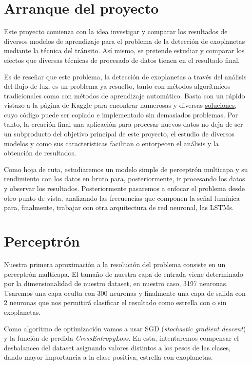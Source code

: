 
\section{Arranque del proyecto}

Este proyecto comienza con la idea investigar y comparar los resultados de diversos modelos de aprendizaje para el problema de la detección de exoplanetas mediante la técnica del tránsito. Así mismo, se pretende estudiar y comparar los efectos que diversas técnicas de procesado de datos tienen en el resultado final.

Es de reseñar que este problema, la detección de exoplanetas a través del análisis del flujo de luz, es un problema ya resuelto, tanto con métodos algorítmicos tradicionales como con métodos de aprendizaje automático. Basta con un rápido vistazo a la página de Kaggle para encontrar numerosas y diversas \href{https://www.kaggle.com/keplersmachines/kepler-labelled-time-series-data/kernels}{soluciones}, cuyo código puede ser copiado e implementado sin demasiados problemas. Por tanto, la creación final una aplicación para procesar nuevos datos no deja de ser un subproducto del objetivo principal de este proyecto, el estudio de diversos modelos y como sus características facilitan o entorpecen el análisis y la obtención de resultados.

Como hoja de ruta, estudiaremos un modelo simple de perceptrón multicapa y su rendimiento con los datos en bruto para, posteriormente, ir procesando los datos y observar los resultados. Posteriormente pasaremos a enfocar el problema desde otro punto de vista, analizando las frecuencias que componen la señal lumínica para, finalmente, trabajar con otra arquitectura de red neuronal, las LSTMs.

\section{Perceptrón}

Nuestra primera aproximación a la resolución del problema consiste en un perceptrón multicapa. El tamaño de nuestra capa de entrada viene determinado por la dimensionalidad de nuestro dataset, en nuestro caso, 3197 neuronas. Usaremos una capa oculta con 300 neuronas y finalmente una capa de salida con 2 neuronas que nos permitirá clasificar el resultado como estrella con o sin exoplanetas.

Como algoritmo de optimización vamos a usar SGD (\textit{stochastic gradient descent}) y la función de perdida \textit{CrossEntropyLoss}. En esta, intentaremos compensar el desbalanceo del dataset asignando valores distintos a los pesos de las clases, dando mayor importancia a la clase positiva, estrella con exoplanetas.

